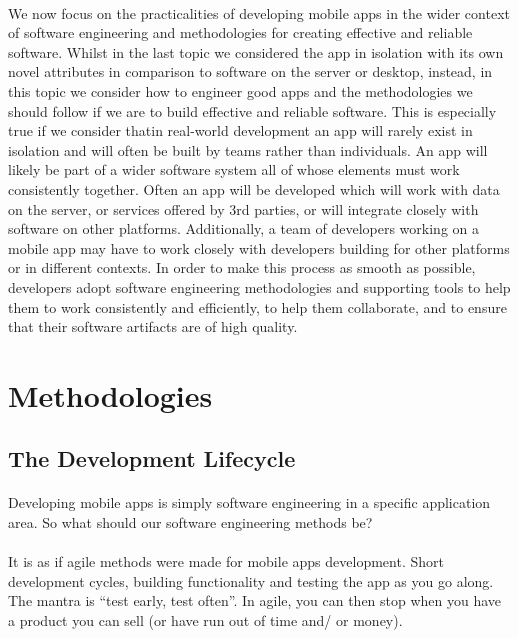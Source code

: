 \documentclass[12pt, a4paper, twoside]{book}
\begin{document}
\paragraph{} We now focus on the practicalities of developing mobile apps in the wider context of software engineering and methodologies for creating effective and reliable software. Whilst in the last topic we considered the app in isolation with its own novel attributes in comparison to software on the server or desktop, instead, in this topic we consider how to engineer good apps and the methodologies we should follow if we are to build effective and reliable software. This is especially true if we consider thatin real-world development an app will rarely exist in isolation and will often be built by teams rather than individuals. An app will likely be part of a wider software system all of whose elements must work consistently together. Often an app will be developed which will work with data on the server, or services offered by 3rd parties, or will integrate closely with software on other platforms. Additionally, a team of developers working on a mobile app may have to work closely with developers building for other platforms or in different contexts. In order to make this process as smooth as possible, developers adopt software engineering methodologies and supporting tools to help them to work consistently and efficiently, to help them collaborate, and to ensure that their software artifacts are of high quality.



\section{Methodologies}
\subsection{The Development Lifecycle}
\paragraph{} Developing mobile apps is simply software engineering in a specific application area. So what should our software engineering methods be?

\paragraph{} It is as if agile methods were made for mobile apps development. Short development cycles, building functionality and testing the app as you go along. The mantra is “test early, test often”. In agile, you can then stop when you have a product you can sell (or have run out of time and/ or money).
\end{document}
